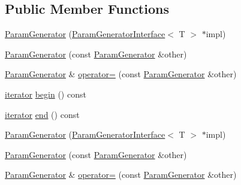 \subsection*{Public Member Functions}
\begin{DoxyCompactItemize}
\item 
\mbox{\hyperlink{classtesting_1_1internal_1_1_param_generator_a6b017d4d030927714d495ee95ae92fbc}{Param\+Generator}} (\mbox{\hyperlink{classtesting_1_1internal_1_1_param_generator_interface}{Param\+Generator\+Interface}}$<$ T $>$ $\ast$impl)
\item 
\mbox{\hyperlink{classtesting_1_1internal_1_1_param_generator_a5891d25c31919b3099489f8bbcd58b5e}{Param\+Generator}} (const \mbox{\hyperlink{classtesting_1_1internal_1_1_param_generator}{Param\+Generator}} \&other)
\item 
\mbox{\hyperlink{classtesting_1_1internal_1_1_param_generator}{Param\+Generator}} \& \mbox{\hyperlink{classtesting_1_1internal_1_1_param_generator_a590a03c6e0a3a3ac6279943ad1f01dc8}{operator=}} (const \mbox{\hyperlink{classtesting_1_1internal_1_1_param_generator}{Param\+Generator}} \&other)
\item 
\mbox{\hyperlink{classtesting_1_1internal_1_1_param_generator_a448b08a8eaae1f1d27840d4dbd66c357}{iterator}} \mbox{\hyperlink{classtesting_1_1internal_1_1_param_generator_a14e735c8bd113556ae905a560cd2d607}{begin}} () const
\item 
\mbox{\hyperlink{classtesting_1_1internal_1_1_param_generator_a448b08a8eaae1f1d27840d4dbd66c357}{iterator}} \mbox{\hyperlink{classtesting_1_1internal_1_1_param_generator_aaf8f75df1099a07ff771a550b48f9fbe}{end}} () const
\item 
\mbox{\hyperlink{classtesting_1_1internal_1_1_param_generator_a6b017d4d030927714d495ee95ae92fbc}{Param\+Generator}} (\mbox{\hyperlink{classtesting_1_1internal_1_1_param_generator_interface}{Param\+Generator\+Interface}}$<$ T $>$ $\ast$impl)
\item 
\mbox{\hyperlink{classtesting_1_1internal_1_1_param_generator_a5891d25c31919b3099489f8bbcd58b5e}{Param\+Generator}} (const \mbox{\hyperlink{classtesting_1_1internal_1_1_param_generator}{Param\+Generator}} \&other)
\item 
\mbox{\hyperlink{classtesting_1_1internal_1_1_param_generator}{Param\+Generator}} \& \mbox{\hyperlink{classtesting_1_1internal_1_1_param_generator_a590a03c6e0a3a3ac6279943ad1f01dc8}{operator=}} (const \mbox{\hyperlink{classtesting_1_1internal_1_1_param_generator}{Param\+Generator}} \&other)
\item 

\end{DoxyCompactItemize}
